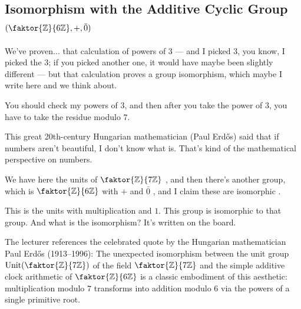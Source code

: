 \subsection{Isomorphism with the Additive Cyclic Group \texorpdfstring{$(\faktor{\mathbb{Z}}{6\mathbb{Z}}, +, \bar{0})$}{(Z/6Z, +, 0)}}

\begin{speech}[00:39:54 - 00:41:19]
We've proven... that calculation of powers of $3$ --- and I picked $3$, you know, I picked the $3$; if you picked another one, it would have maybe been slightly different --- but that calculation proves a group isomorphism, which maybe I write here and we think about. 

You should check my powers of $3$, and then after you take the power of $3$, you have to take the residue modulo $7$.

This great 20th-century Hungarian mathematician (Paul Erd\H{o}s) said that if numbers aren't beautiful, I don't know what is. That's kind of the mathematical perspective on numbers.

We have here the units of $\faktor{\mathbb{Z}}{7\mathbb{Z}}$ , and then there's another group, which is $\faktor{\mathbb{Z}}{6\mathbb{Z}}$ with $+$ and $\bar{0}$ , and I claim these are isomorphic .

This is the units with multiplication and $1$. This group is isomorphic to that group. And what is the isomorphism? It's written on the board.
\end{speech}

\begin{insight}
The lecturer references the celebrated quote by the Hungarian mathematician Paul Erd\H{o}s (1913--1996):  The unexpected isomorphism between the unit group $\operatorname{Unit}(\faktor{\mathbb{Z}}{7\mathbb{Z}})$ of the field $\faktor{\mathbb{Z}}{7\mathbb{Z}}$ and the simple additive clock arithmetic of $\faktor{\mathbb{Z}}{6\mathbb{Z}}$ is a classic embodiment of this aesthetic: multiplication modulo $7$ transforms into addition modulo $6$ via the powers of a single primitive root.
\end{insight}

